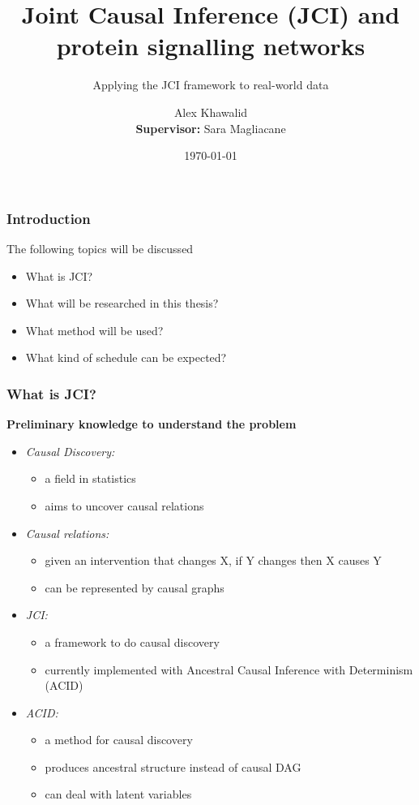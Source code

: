 \documentclass[10pt, compress]{beamer}
\title{Joint Causal Inference (JCI) and protein signalling networks}
\subtitle{Applying the JCI framework to real-world data}
\date{\today}
\author{Alex Khawalid\\\textbf{Supervisor:} Sara Magliacane}
\institute{Universiteit van Amsterdam}
\begin{document}
\maketitle

\begin{frame}
    \frametitle{Introduction}
    The following topics will be discussed
    \begin{itemize}
        \item What is JCI?
        \item What will be researched in this thesis?
        \item What method will be used?
        \item What kind of schedule can be expected?
    \end{itemize}
\end{frame}

\begin{frame}
    \frametitle{What is JCI?}
    \textbf{Preliminary knowledge to understand the problem}
    \begin{itemize}
        \item \textit{Causal Discovery:} \begin{itemize}
            \item a field in statistics
            \item aims to uncover causal relations
        \end{itemize}
        \item \textit{Causal relations:}\begin{itemize}
            \item given an intervention that changes X, if Y changes then X causes Y
            \item can be represented by causal graphs
        \end{itemize}
        \item \textit{JCI:} \begin{itemize}
            \item a framework to do causal discovery
            \item currently implemented with Ancestral Causal Inference with Determinism (ACID)
        \end{itemize}
        \item \textit{ACID:} \begin{itemize}
            \item a method for causal discovery
            \item produces ancestral structure instead of causal DAG
            \item can deal with latent variables
        \end{itemize}
    \end{itemize}
\end{frame}
\end{document}
